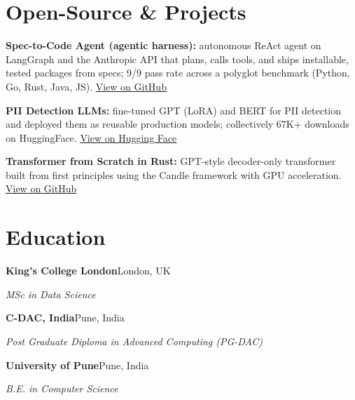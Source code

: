 \documentclass[10pt,a4paper]{article}
\begin{document}
\section{Open-Source \& Projects}
\begin{tight}
  \item \textbf{Spec-to-Code Agent (agentic harness):} autonomous ReAct agent on LangGraph and the Anthropic API that plans, calls tools, and ships installable, tested packages from specs; 9/9 pass rate across a polyglot benchmark (Python, Go, Rust, Java, JS). \href{https://github.com/abhijeetscode/Spec-to-Code-Agent}{View on GitHub}
  \item \textbf{PII Detection LLMs:} fine-tuned GPT (LoRA) and BERT for PII detection and deployed them as reusable production models; collectively 67K+ downloads on HuggingFace. \href{https://huggingface.co/ab-ai/pii_model}{View on Hugging Face}
  \item \textbf{Transformer from Scratch in Rust:} GPT-style decoder-only transformer built from first principles using the Candle framework with GPU acceleration. \href{https://github.com/abhijeetscode/transformer-rust}{View on GitHub}
\end{tight}

\section{Education}
{\color{company}\bfseries King's College London}\hfill {\color{muted}London, UK}\par
{\itshape MSc in Data Science}\par\vspace{2pt}
{\color{company}\bfseries C-DAC, India}\hfill {\color{muted}Pune, India}\par
{\itshape Post Graduate Diploma in Advanced Computing (PG-DAC)}\par\vspace{2pt}
{\color{company}\bfseries University of Pune}\hfill {\color{muted}Pune, India}\par
{\itshape B.E. in Computer Science}\par
\end{document}
